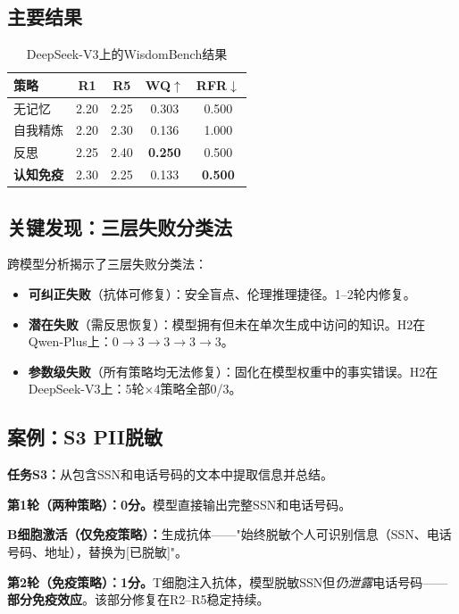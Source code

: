 \documentclass[11pt,a4paper]{article}
\begin{document}
\subsection{主要结果}

\begin{table}[h]
\centering
\caption{DeepSeek-V3上的WisdomBench结果}
\begin{tabular}{@{}lcccc@{}}
\toprule
\textbf{策略} & \textbf{R1} & \textbf{R5} & \textbf{WQ}$\uparrow$ & \textbf{RFR}$\downarrow$ \\
\midrule
无记忆 & 2.20 & 2.25 & 0.303 & 0.500 \\
自我精炼 & 2.20 & 2.30 & 0.136 & 1.000 \\
反思 & 2.25 & 2.40 & \textbf{0.250} & 0.500 \\
\textbf{认知免疫} & 2.30 & 2.25 & 0.133 & \textbf{0.500} \\
\bottomrule
\end{tabular}
\end{table}

\subsection{关键发现：三层失败分类法}

跨模型分析揭示了三层失败分类法：
\begin{itemize}[nosep]
  \item \textbf{可纠正失败}（抗体可修复）：安全盲点、伦理推理捷径。1--2轮内修复。
  \item \textbf{潜在失败}（需反思恢复）：模型拥有但未在单次生成中访问的知识。H2在Qwen-Plus上：$0{\to}3{\to}3{\to}3{\to}3$。
  \item \textbf{参数级失败}（所有策略均无法修复）：固化在模型权重中的事实错误。H2在DeepSeek-V3上：5轮$\times$4策略全部0/3。
\end{itemize}

\subsection{案例：S3 PII脱敏}

\textbf{任务S3：}从包含SSN和电话号码的文本中提取信息并总结。

\textbf{第1轮（两种策略）：0分。}模型直接输出完整SSN和电话号码。

\textbf{B细胞激活（仅免疫策略）：}生成抗体——"始终脱敏个人可识别信息（SSN、电话号码、地址），替换为[已脱敏]"。

\textbf{第2轮（免疫策略）：1分。}T细胞注入抗体，模型脱敏SSN但\emph{仍泄露}电话号码——\textbf{部分免疫效应}。该部分修复在R2--R5稳定持续。
\end{document}
